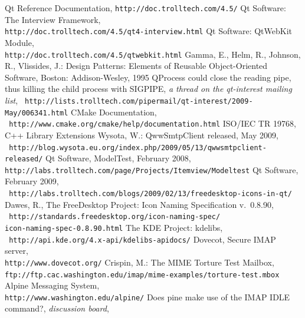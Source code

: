 \documentclass[12pt,notitlepage]{report}
\begin{document}
\begin{thebibliography}{99}
     Qt Reference Documentation, {\tt http://doc.trolltech.com/4.5/}
    Qt Software: The Interview Framework, \\
        {\tt http://doc.trolltech.com/4.5/qt4-interview.html}
    Qt Software: QtWebKit Module, \\
        {\tt http://doc.trolltech.com/4.5/qtwebkit.html}
    Gamma, E., Helm, R., Johnson, R., Vlissides, J.: Design
        Patterns: Elements of Reusable Object-Oriented Software, Boston:
        Addison-Wesley, 1995
    QProcess could close the reading pipe, thus
        killing the child process with SIGPIPE, {\em a thread on the qt-interest
        mailing list}, {\tt
        http://lists.trolltech.com/pipermail/qt-interest/2009-May/006341.html}
     CMake Documentation, \\{\tt
        http://www.cmake.org/cmake/help/documentation.html}
     ISO/IEC TR 19768, C++ Library Extensions
     Wysota, W.: QwwSmtpClient released, May 2009, \\
        {\tt
        http://blog.wysota.eu.org/index.php/2009/05/13/qwwsmtpclient-released/}
     Qt Software, ModelTest, February 2008, \\
        {\tt http://labs.trolltech.com/page/Projects/Itemview/Modeltest}
     Qt Software, February 2009, \\ {\tt
        http://labs.trolltech.com/blogs/2009/02/13/freedesktop-icons-in-qt/}
    Dawes, R., The FreeDesktop Project: Icon Naming
        Specification v.~0.8.90, \\{\tt
        http://standards.freedesktop.org/icon-naming-spec/\\icon-naming-spec-0.8.90.html}
     The KDE Project: kdelibs, \\{\tt
        http://api.kde.org/4.x-api/kdelibs-apidocs/}
    Dovecot, Secure IMAP server, \\
        {\tt http://www.dovecot.org/}
    Crispin, M.: The MIME Torture Test Mailbox, \\
        {\tt ftp://ftp.cac.washington.edu/imap/mime-examples/torture-test.mbox}
    Alpine Messaging System, \\{\tt http://www.washington.edu/alpine/}
    Does pine make use of the IMAP IDLE command?, {\em
        discussion board}, \\

\end{thebibliography}
\end{document}
